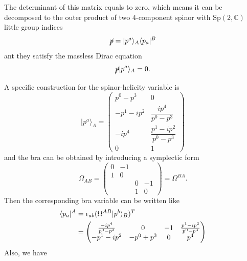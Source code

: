 \documentclass[12pt]{article}
\newcommand{\aket}[1]{|#1\rangle}
\newcommand{\abra}[1]{\langle #1|}
\begin{document}
The determinant of this matrix equals to zero, which means it can be decomposed to the outer product of two 4-component spinor with $\mathrm{Sp}(2,\mathbb{C})$ little group indices
\begin{equation}
    \cancel{p}=\aket{p^a}_A\abra{p_a}^B
\end{equation}
ant they satisfy the massless Dirac equation
\begin{equation}
    \cancel{p}\aket{p^a}_A=0.
\end{equation}

A specific construction for the spinor-helicity variable is 
\begin{equation}
    \aket{p^a}_A=\begin{pmatrix}
        p^0 - p^3 & 0 \\
        -p^1 - ip^2 & \dfrac{ip^4}{p^0-p^3} \\
        -ip^4 & \dfrac{p^1 - ip^2}{p^0 - p^3} \\
        0 & 1
    \end{pmatrix}
\end{equation}
and the bra can be obtained by introducing a symplectic form
\begin{equation}
    \Omega_{AB}=\begin{pmatrix}
        0 & -1 & & \\
        1 & 0 & & \\
         & & 0 & -1 \\
         & & 1 & 0
    \end{pmatrix}=\Omega^{BA}.
\end{equation}
Then the corresponding bra variable can be written like 
\begin{align}
    \abra{p_a}^A&=\epsilon_{ab}(\Omega^{AB}\aket{p^b}_B)^T\notag \\
    &=\begin{pmatrix}
        \frac{-ip^4}{p^0-p^3} & 0 & -1 & \frac{p^1-ip^2}{p^0-p^3}\\
        -p^1-ip^2 & -p^0+p^3 & 0 & p^4 
    \end{pmatrix}
\end{align}
Also, we have 
\end{document}
